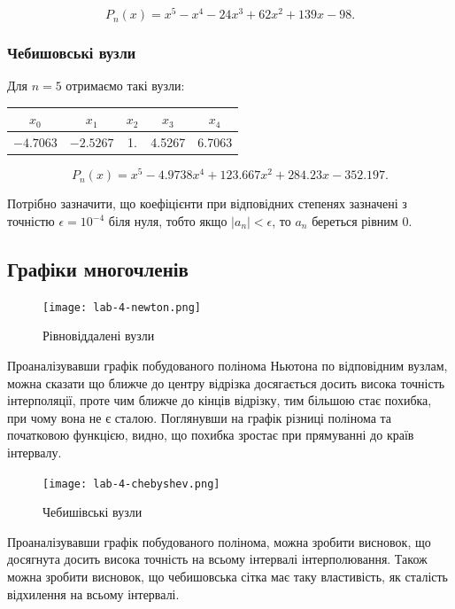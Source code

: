 \[P_n(x) = x^5 - x^4 - 24x^3 + 62 x^2 + 139 x - 98.\]

\subsubsection{Чебишовські вузли}
Для $n = 5$ отримаємо такі вузли:
\begin{table}[H]
	\centering
	\begin{tabular}{|c|c|c|c|c|}
	\hline
	$x_0$ & $x_1$ & $x_2$ & $x_3$ & $x_4$\\ \hline
	$-4.7063$ & $-2.5267$ & 1. & 4.5267 & 6.7063 \\ \hline
	\end{tabular}
\end{table}

\[P_n(x) = x^5 - 4.9738 x^4 + 123.667 x^2 + 284.23 x - 352.197.\]

Потрібно зазначити, що коефіцієнти при відповідних степенях зазначені з точністю $\epsilon = 10^{-4}$ біля нуля, тобто якщо $|a_n|<\epsilon$, то $a_n$ береться рівним $0$.

\subsection{Графіки многочленів}

\begin{figure}[H]
	\centering
	\texttt{[image: lab-4-newton.png]}
	\caption{Рівновіддалені вузли}
\end{figure}

Проаналізувавши графік побудованого полінома Ньютона по відповідним вузлам, можна сказати що ближче до центру відрізка досягається досить висока точність інтерполяції, проте чим ближче до кінців відрізку, тим більшою стає похибка, при чому вона не є сталою. Поглянувши на графік різниці полінома та початковою функцією, видно, що похибка зростає при прямуванні до країв інтервалу.

\begin{figure}[H]
	\centering
	\texttt{[image: lab-4-chebyshev.png]}
	\caption{Чебишівські вузли}
\end{figure}

Проаналізувавши графік побудованого полінома, можна зробити висновок, що досягнута досить висока точність на всьому інтервалі інтерполювання. Також можна зробити висновок, що чебишовська сітка має таку властивість, як сталість відхилення на всьому інтервалі.


